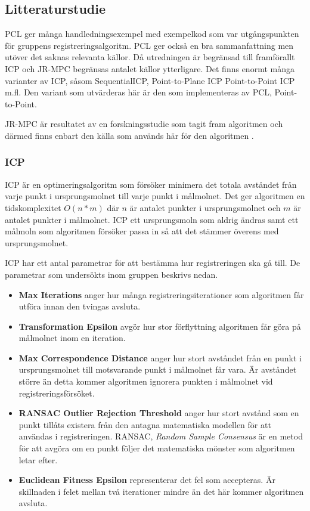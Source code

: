 \subsection{Litteraturstudie}
PCL ger många handledningsexempel med exempelkod som var utgångspunkten för gruppens registreringsalgoritm. PCL ger också en bra sammanfattning men utöver det saknas relevanta källor. Då utredningen är begränsad till framförallt ICP och JR-MPC begränsas antalet källor ytterligare. Det finns enormt många varianter av ICP, såsom SequentialICP, Point-to-Plane ICP Point-to-Point ICP m.fl. Den variant som utvärderas här är den som implementeras av PCL, Point-to-Point. 

JR-MPC är resultatet av en forskningsstudie som tagit fram algoritmen och därmed finns enbart den källa som används här för den algoritmen \cite{Evangelidis-ECCV-2014}. 

\subsubsection{ICP}
\label{sec:icp-karlsson}
ICP är en optimeringsalgoritm som försöker minimera det totala avståndet från varje punkt i ursprungsmolnet till varje punkt i målmolnet. Det ger algoritmen en tidskomplexitet $ \mathit{O(n*m)} $ där $ \mathit{n} $ är antalet punkter i ursprungsmolnet och $ \mathit{m} $ är antalet punkter i målmolnet. ICP ett ursprungsmoln som aldrig ändras samt ett målmoln som algoritmen försöker passa in så att det stämmer överens med ursprungsmolnet. 

ICP har ett antal parametrar för att bestämma hur registreringen ska gå till. De parametrar som undersökts inom gruppen beskrivs nedan.
\begin{itemize}
	\item \textbf{Max Iterations} anger hur många registrerings\-iterationer som algoritmen får utföra innan den tvingas avsluta.
	\item \textbf{Transformation Epsilon} avgör hur stor förflyttning algoritmen får göra på målmolnet inom en iteration.
	\item \textbf{Max Correspondence Distance} anger hur stort avståndet från en punkt i ursprungsmolnet till motsvarande punkt i målmolnet får vara. Är avståndet större än detta kommer algoritmen ignorera punkten i målmolnet vid registreringsförsöket.
	\item \textbf{RANSAC Outlier Rejection Threshold} anger hur stort avstånd som en punkt tillåts existera från den antagna matematiska modellen för att användas i registreringen. RANSAC, \textit{Random Sample Consensus} är en metod för att avgöra om en punkt följer det matematiska mönster som algoritmen letar efter.
	\item \textbf{Euclidean Fitness Epsilon} representerar det fel som accepteras. Är skillnaden i felet mellan två iterationer mindre än det här kommer algoritmen avsluta.
\end{itemize}

